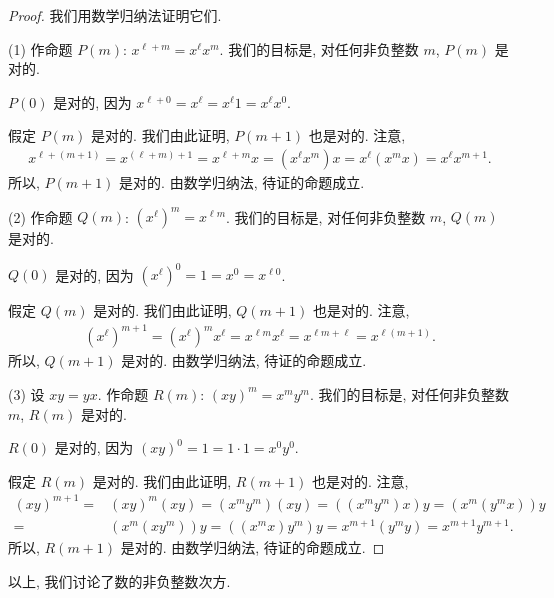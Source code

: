 \documentclass[../libro.tex]{subfiles}
\begin{document}
\begin{proof}
    我们用数学归纳法证明它们.

    (1)
    作命题 \(P(m)\):
    \(x^{\ell+m} = x^{\ell} x^{m}\).
    我们的目标是,
    对任何非负整数 \(m\), \(P(m)\) 是对的.

    \(P(0)\) 是对的, 因为
    \(x^{\ell+0} = x^{\ell} = x^{\ell} 1 = x^{\ell} x^{0}\).

    假定 \(P(m)\) 是对的.
    我们由此证明, \(P(m+1)\) 也是对的.
    注意,
    \begin{align*}
        x^{\ell+(m+1)}
        = x^{(\ell+m)+1}
        = x^{\ell+m} x
        = (x^{\ell} x^{m}) x
        = x^{\ell} (x^{m} x)
        = x^{\ell} x^{m+1}.
    \end{align*}
    所以, \(P(m+1)\) 是对的.
    由数学归纳法, 待证的命题成立.

    (2)
    作命题 \(Q(m)\):
    \((x^{\ell})^{m} = x^{\ell m}\).
    我们的目标是,
    对任何非负整数 \(m\), \(Q(m)\) 是对的.

    \(Q(0)\) 是对的, 因为
    \((x^{\ell})^{0} = 1 = x^{0} = x^{\ell 0}\).

    假定 \(Q(m)\) 是对的.
    我们由此证明, \(Q(m+1)\) 也是对的.
    注意,
    \begin{align*}
        (x^{\ell})^{m+1}
        = (x^{\ell})^{m} x^{\ell}
        = x^{\ell m} x^{\ell}
        = x^{\ell m + \ell}
        = x^{\ell (m+1)}.
    \end{align*}
    所以, \(Q(m+1)\) 是对的.
    由数学归纳法, 待证的命题成立.

    (3)
    设 \(x y = y x\).
    作命题 \(R(m)\):
    \((x y)^{m} = x^{m} y^{m}\).
    我们的目标是,
    对任何非负整数 \(m\), \(R(m)\) 是对的.

    \(R(0)\) 是对的, 因为
    \((x y)^0 = 1 = 1 \cdot 1 = x^0 y^0\).

    假定 \(R(m)\) 是对的.
    我们由此证明, \(R(m+1)\) 也是对的.
    注意,
    \begin{align*}
        (x y)^{m+1}
        = {} &
        (x y)^{m} (x y)
        = (x^{m} y^{m}) (x y)
        = ((x^{m} y^{m}) x) y
        = (x^{m} (y^{m} x)) y
        \\
        = {} &
        (x^{m} (x y^{m})) y
        = ((x^{m} x) y^{m}) y
        = x^{m+1} (y^{m} y)
        = x^{m+1} y^{m+1}.
    \end{align*}
    所以, \(R(m+1)\) 是对的.
    由数学归纳法, 待证的命题成立.
\end{proof}

以上, 我们讨论了数的非负整数次方.
\end{document}
